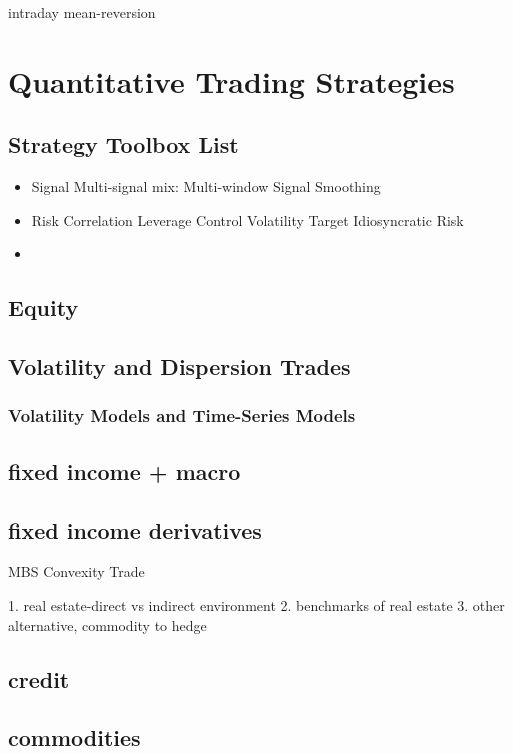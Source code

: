 \documentclass[11pt, openany]{book}              %
\begin{document}
intraday mean-reversion


\chapter{Quantitative Trading Strategies}

\section{Strategy Toolbox List}

\begin{itemize}
	\item Signal
		\subitem Multi-signal mix: Multi-window
		\subitem Signal Smoothing
	\item Risk
		\subitem Correlation
		\subitem Leverage Control
		\subitem Volatility Target
		\subitem Idiosyncratic Risk 
	\item 
\end{itemize}



\section{Equity}
\section{Volatility and Dispersion Trades}
	\subsection{Volatility Models and Time-Series Models}
	
\section{fixed income + macro}
\section{fixed income derivatives}

MBS Convexity Trade

    1. real estate-direct vs indirect environment  
    2. benchmarks of real estate
    3. other alternative, commodity to hedge

\section{credit}
\section{commodities} 
\end{document}
